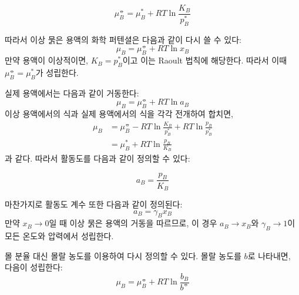         \begin{defn}
        \begin{equation*}
            \mu_B^\circlehbar = \mu_B^\ast +RT\ln{\frac{K_B}{p_B^\ast}}
        \end{equation*}
        \end{defn}
        따라서 이상 묽은 용액의 화학 퍼텐셜은 다음과 같이 다시 쓸 수 있다:
        \begin{equation*}
            \mu_B = \mu_B^\circlehbar + RT\ln{x_B}
        \end{equation*}
        만약 용액이 이상적이면, $K_B = p_B^\ast$이고 이는 Raoult 법칙에 해당한다. 따라서 이때 $\mu_B^\circlehbar = \mu_B^\ast$가 
        성립한다.
        \par 실제 용액에서는 다음과 같이 거동한다:
        \begin{equation*}
            \mu_B = \mu_B^\circlehbar + RT\ln{a_B}
        \end{equation*}
        이상 용액에서의 식과 실제 용액에서의 식을 각각 전개하여 합치면, 
        \begin{equation*}
            \begin{aligned}
                \mu_B &= \mu_B^\circlehbar - RT\ln{\frac{K_B}{p_B^\ast}} + RT \ln{\frac{p_B}{p_B^\ast}} \\
                &= \mu_B^\ast + RT\ln{\frac{p_B}{K_B}}
            \end{aligned}
        \end{equation*}
        과 같다. 따라서 활동도를 다음과 같이 정의할 수 있다:
        \begin{defn}
        \begin{equation*}
            a_B = \frac{p_B}{K_B}
        \end{equation*}
        \end{defn}
        마찬가지로 활동도 계수 또한 다음과 같이 정의된다:
        \begin{equation*}
            a_B = \gamma_B x_B
        \end{equation*}
        만약 $x_B \rightarrow 0$일 때 이상 묽은 용액의 거동을 따르므로, 이 경우 $a_B \rightarrow x_B$와 $\gamma_B \rightarrow 1$이 
        모든 온도와 압력에서 성립한다.
        \par 몰 분율 대신 몰랄 농도를 이용하여 다시 정의할 수 있다. 몰랄 농도를 $b$로 나타내면, 다음이 성립한다:
        \begin{equation*}
            \mu_B = \mu_B^\circlehbar +RT \ln{\frac{b_B}{b^\circlehbar}}
        \end{equation*}
